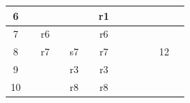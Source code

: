 \documentclass{article}
\begin{document}
\begin{latin}
\begin{table}[H]
\begin{tabular}{|ccccccccccccc|}
\multicolumn{1}{|c|}{{\color[HTML]{0000FF} 6}}         & \multicolumn{1}{c|}{}           & \multicolumn{1}{c|}{}           & \multicolumn{1}{c|}{}           & \multicolumn{1}{c|}{}           & \multicolumn{1}{c|}{}           & \multicolumn{1}{c|}{r1}                         & \multicolumn{1}{c|}{}            & \multicolumn{1}{c|}{}                         & \multicolumn{1}{c|}{}                         & \multicolumn{1}{c|}{}                          & \multicolumn{1}{c|}{}                          &                          \\ \hline
\multicolumn{1}{|c|}{{\color[HTML]{0000FF} 7}}         & \multicolumn{1}{c|}{}           & \multicolumn{1}{c|}{r6}         & \multicolumn{1}{c|}{}           & \multicolumn{1}{c|}{}           & \multicolumn{1}{c|}{}           & \multicolumn{1}{c|}{r6}                         & \multicolumn{1}{c|}{}            & \multicolumn{1}{c|}{}                         & \multicolumn{1}{c|}{}                         & \multicolumn{1}{c|}{}                          & \multicolumn{1}{c|}{}                          &                          \\ \hline
\multicolumn{1}{|c|}{{\color[HTML]{0000FF} 8}}         & \multicolumn{1}{c|}{}           & \multicolumn{1}{c|}{r7}         & \multicolumn{1}{c|}{}           & \multicolumn{1}{c|}{s7}         & \multicolumn{1}{c|}{}           & \multicolumn{1}{c|}{r7}                         & \multicolumn{1}{c|}{}            & \multicolumn{1}{c|}{}                         & \multicolumn{1}{c|}{}                         & \multicolumn{1}{c|}{}                          & \multicolumn{1}{c|}{{\color[HTML]{0000FF} 12}} &                          \\ \hline
\multicolumn{1}{|c|}{{\color[HTML]{0000FF} 9}}         & \multicolumn{1}{c|}{}           & \multicolumn{1}{c|}{}           & \multicolumn{1}{c|}{}           & \multicolumn{1}{c|}{r3}         & \multicolumn{1}{c|}{}           & \multicolumn{1}{c|}{r3}                         & \multicolumn{1}{c|}{}            & \multicolumn{1}{c|}{}                         & \multicolumn{1}{c|}{}                         & \multicolumn{1}{c|}{}                          & \multicolumn{1}{c|}{}                          &                          \\ \hline
\multicolumn{1}{|c|}{{\color[HTML]{0000FF} 10}}        & \multicolumn{1}{c|}{}           & \multicolumn{1}{c|}{}           & \multicolumn{1}{c|}{}           & \multicolumn{1}{c|}{r8}         & \multicolumn{1}{c|}{}           & \multicolumn{1}{c|}{r8}                         & \multicolumn{1}{c|}{}            & \multicolumn{1}{c|}{}                         & \multicolumn{1}{c|}{}                         & \multicolumn{1}{c|}{}                          & \multicolumn{1}{c|}{}                          &                          \\ \hline

\end{tabular}
\end{table}
\end{latin}
\end{document}
